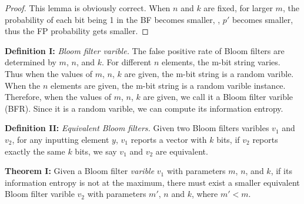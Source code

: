 \begin{proof}
This lemma is obviously correct. When $n$ and $k$ are fixed, %
for larger $m$, the probability of each bit being 1 in the BF becomes smaller, \ie, $p'$ becomes smaller, thus the FP probability gets smaller.
\end{proof}

\textbf{Definition I:} \textit{Bloom filter varible.} The false positive rate of Bloom filters are determined by $m$, $n$, and $k$. For different $n$ elements, the m-bit string varies. Thus when the values of $m$, $n$, $k$ are given, the m-bit string is a random varible. When the $n$ elements are given, the m-bit string is a random varible instance. Therefore, when the values of $m$, $n$, $k$ are given, we call it a Bloom filter varible (BFR). Since it is a random varible, we can compute its information entropy.

\textbf{Definition II:} \textit{Equivalent Bloom filters.} Given two Bloom filters varibles $v_1$ and $v_2$, for any inputting element $y$, $v_1$ reports a vector with $k$ bits, if $v_2$ reports exactly the same $k$ bits, we say $v_1$ and $v_2$ are equivalent.

\textbf{Theorem I:} 
Given a Bloom filter \textit{varible} $v_1$ with parameters $m$, $n$, and $k$, if its information entropy is not at the maximum, there must exist a smaller equivalent Bl\textbf{}oom filter varible $v_2$ with parameters $m'$, $n$ and $k$, where $m'<m$.

